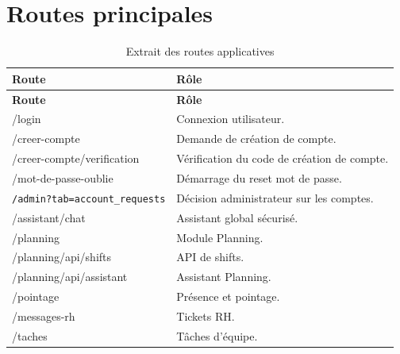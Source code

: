 \documentclass[12pt,a4paper]{report}
\begin{document}
\chapter{Routes principales}

\begin{longtable}{>{\raggedright\arraybackslash}p{5cm}>{\raggedright\arraybackslash}p{9cm}}
\caption{Extrait des routes applicatives}\label{tab:routes}\\
\toprule
\textbf{Route} & \textbf{Rôle} \\
\midrule
\endfirsthead
\toprule
\textbf{Route} & \textbf{Rôle} \\
\midrule
\endhead
/login & Connexion utilisateur. \\
/creer-compte & Demande de création de compte. \\
/creer-compte/verification & Vérification du code de création de compte. \\
/mot-de-passe-oublie & Démarrage du reset mot de passe. \\
\texttt{/admin?tab=}\newline\texttt{account\_requests} & Décision administrateur sur les comptes. \\
/assistant/chat & Assistant global sécurisé. \\
/planning & Module Planning. \\
/planning/api/shifts & API de shifts. \\
/planning/api/assistant & Assistant Planning. \\
/pointage & Présence et pointage. \\
/messages-rh & Tickets RH. \\
/taches & Tâches d'équipe. \\
\bottomrule
\end{longtable}
\end{document}

